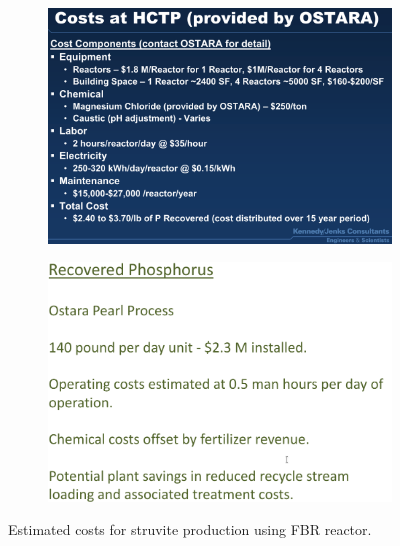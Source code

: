 \documentclass[10pt,a4paper]{article}
\begin{document}
\begin{figure}[H]
	\begin{subfigure}[t]{0.5\linewidth}
		\includegraphics[width=\linewidth]{ostara_costs} 
	\end{subfigure}
	\quad
	\begin{subfigure}[t]{0.5\linewidth}
		\includegraphics[width=\linewidth]{ostara_costs2}
	\end{subfigure}
	
	\caption{Estimated costs for struvite production using FBR reactor.}
	\label{fig:ostara_costs}
\end{figure}
\end{document}

